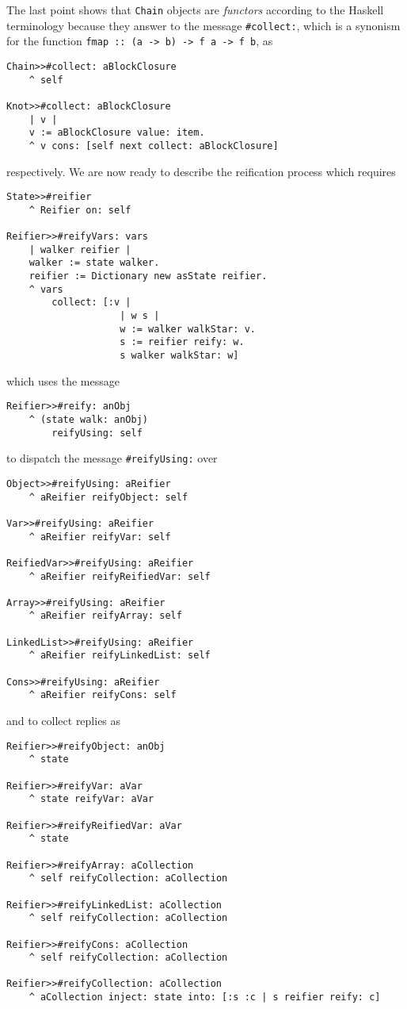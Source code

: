 \documentclass[a4paper,11pt]{article}
\begin{document}
The last point shows that \Verb|Chain| objects are \textit{functors} according
to the Haskell terminology because they answer to the message \Verb|#collect:|,
which is a synonism for the function \Verb|fmap :: (a -> b) -> f a -> f b|, as
\begin{verbatim}
Chain>>#collect: aBlockClosure
    ^ self

Knot>>#collect: aBlockClosure
    | v |
    v := aBlockClosure value: item.
    ^ v cons: [self next collect: aBlockClosure]
\end{verbatim}
respectively.  We are now ready to describe the reification process which
requires
\begin{verbatim}
State>>#reifier
    ^ Reifier on: self

Reifier>>#reifyVars: vars
    | walker reifier |
    walker := state walker.
    reifier := Dictionary new asState reifier.
    ^ vars
        collect: [:v |
                    | w s |
                    w := walker walkStar: v.
                    s := reifier reify: w.
                    s walker walkStar: w]
\end{verbatim}
which uses the message
\begin{verbatim}
Reifier>>#reify: anObj 
    ^ (state walk: anObj) 
        reifyUsing: self
\end{verbatim}
to dispatch the message \Verb|#reifyUsing:| over
\begin{verbatim}
Object>>#reifyUsing: aReifier
    ^ aReifier reifyObject: self 

Var>>#reifyUsing: aReifier 
    ^ aReifier reifyVar: self 

ReifiedVar>>#reifyUsing: aReifier 
    ^ aReifier reifyReifiedVar: self

Array>>#reifyUsing: aReifier
    ^ aReifier reifyArray: self 

LinkedList>>#reifyUsing: aReifier 
    ^ aReifier reifyLinkedList: self 

Cons>>#reifyUsing: aReifier 
    ^ aReifier reifyCons: self 
\end{verbatim}
and to collect replies as
\begin{verbatim}
Reifier>>#reifyObject: anObj 
    ^ state

Reifier>>#reifyVar: aVar 
    ^ state reifyVar: aVar

Reifier>>#reifyReifiedVar: aVar 
    ^ state

Reifier>>#reifyArray: aCollection 
    ^ self reifyCollection: aCollection

Reifier>>#reifyLinkedList: aCollection 
    ^ self reifyCollection: aCollection

Reifier>>#reifyCons: aCollection 
    ^ self reifyCollection: aCollection

Reifier>>#reifyCollection: aCollection 
    ^ aCollection inject: state into: [:s :c | s reifier reify: c]
\end{verbatim}
\end{document}
